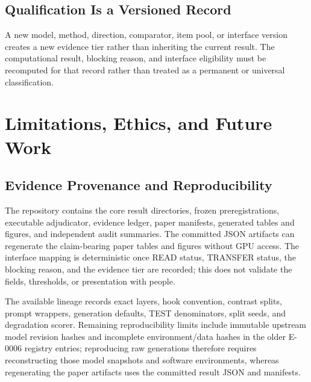 \documentclass[manuscript,review,anonymous]{acmart}
\begin{document}

\subsection{Qualification Is a Versioned Record}\label{qualification-is-a-versioned-record}

A new model, method, direction, comparator, item pool, or interface version creates a new evidence tier rather than inheriting the current result. The computational result, blocking reason, and interface eligibility must be recomputed for that record rather than treated as a permanent or universal classification.


\section{Limitations, Ethics, and Future Work}\label{limitations-ethics-and-future-work}

\subsection{Evidence Provenance and Reproducibility}\label{evidence-provenance-and-reproducibility}

The repository contains the core result directories, frozen preregistrations, executable adjudicator, evidence ledger, paper manifests, generated tables and figures, and independent audit summaries. {}%
The committed JSON artifacts can regenerate the claim-bearing paper tables and figures without GPU access. The interface mapping is deterministic once READ status, TRANSFER status, the blocking reason, and the evidence tier are recorded; this does not validate the fields, thresholds, or presentation with people.

The available lineage records exact layers, hook convention, contrast splits, prompt wrappers, generation defaults, TEST denominators, split seeds, and degradation scorer. {}%
{}%
Remaining reproducibility limits include immutable upstream model revision hashes and incomplete environment/data hashes in the older E-0006 registry entries; reproducing raw generations therefore requires reconstructing those model snapshots and software environments, whereas regenerating the paper artifacts uses the committed result JSON and manifests.
\end{document}
